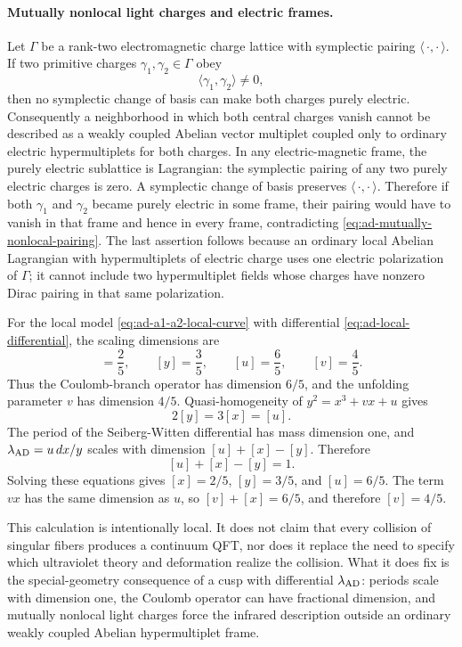 \paragraph{Mutually nonlocal light charges and electric frames.}
Let \(\Gamma\) be a rank-two electromagnetic charge lattice with symplectic
pairing \(\langle\,\cdot,\cdot\,\rangle\).  If two primitive charges
\(\gamma_1,\gamma_2\in\Gamma\) obey
\begin{equation}
  \langle\gamma_1,\gamma_2\rangle\ne0,
  \label{eq:ad-mutually-nonlocal-pairing}
\end{equation}
then no symplectic change of basis can make both charges purely electric.
Consequently a neighborhood in which both central charges vanish cannot be
described as a weakly coupled Abelian vector multiplet coupled only to
ordinary electric hypermultiplets for both charges.
In any electric-magnetic frame, the purely electric sublattice is Lagrangian:
the symplectic pairing of any two purely electric charges is zero.  A
symplectic change of basis preserves
\(\langle\,\cdot,\cdot\,\rangle\).  Therefore if both \(\gamma_1\) and
\(\gamma_2\) became purely electric in some frame, their pairing would have
to vanish in that frame and hence in every frame, contradicting
\eqref{eq:ad-mutually-nonlocal-pairing}.  The last assertion follows because
an ordinary local Abelian Lagrangian with hypermultiplets of electric charge
uses one electric polarization of \(\Gamma\); it cannot include two
hypermultiplet fields whose charges have nonzero Dirac pairing in that same
polarization.

For the local model \eqref{eq:ad-a1-a2-local-curve} with differential
\eqref{eq:ad-local-differential}, the scaling dimensions are
\begin{equation}
  [x]=\frac25,\qquad
  [y]=\frac35,\qquad
  [u]=\frac65,\qquad
  [v]=\frac45 .
  \label{eq:ad-cusp-scaling-dimensions}
\end{equation}
Thus the Coulomb-branch operator has dimension \(6/5\), and the unfolding
parameter \(v\) has dimension \(4/5\).
Quasi-homogeneity of \(y^2=x^3+v x+u\) gives
\[
  2[y]=3[x]=[u].
\]
The period of the Seiberg-Witten differential has mass dimension one, and
\(\lambda_{\rm AD}=u\,dx/y\) scales with dimension \([u]+[x]-[y]\).  Therefore
\[
  [u]+[x]-[y]=1 .
\]
Solving these equations gives \([x]=2/5\), \([y]=3/5\), and
\([u]=6/5\).  The term \(v x\) has the same dimension as \(u\), so
\([v]+[x]=6/5\), and therefore \([v]=4/5\).

This calculation is intentionally local.  It does not claim that every
collision of singular fibers produces a continuum QFT, nor does it replace
the need to specify which ultraviolet theory and deformation realize the
collision.  What it does fix is the special-geometry consequence of a cusp
with differential \(\lambda_{\rm AD}\): periods scale with dimension one,
the Coulomb operator can have fractional dimension, and mutually nonlocal
light charges force the infrared description outside an ordinary weakly
coupled Abelian hypermultiplet frame.

